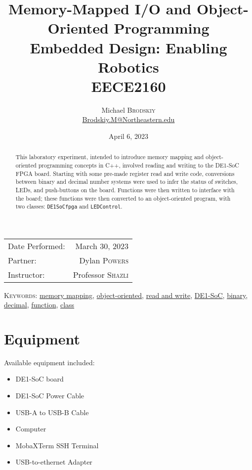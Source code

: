 \documentclass[
	letterpaper, %
	10pt, %
]{CSUniSchoolLabReport}
\title{Memory-Mapped I/O and Object-Oriented Programming\\ Embedded Design: Enabling Robotics \\ EECE2160} %
\author{Michael \textsc{Brodskiy}\\ \small \href{mailto:Brodskiy.M@Northeastern.edu}{Brodskiy.M@Northeastern.edu}}
\date{April 6, 2023} %
\begin{document}
\maketitle %

\begin{center}
	\begin{tabular}{l r}
		Date Performed: & March 30, 2023 \\ %
        Partner: & Dylan \textsc{Powers} \\ %
		Instructor: & Professor \textsc{Shazli} %
	\end{tabular}
\end{center}

\newpage

\begin{abstract}

  This laboratory experiment, intended to introduce memory mapping and object-oriented programming concepts in C++, involved reading and writing to the DE1-SoC FPGA board. Starting with some pre-made register read and write code, conversions between binary and decimal number systems were used to infer the status of switches, LEDs, and push-buttons on the board. Functions were then written to interface with the board; these functions were then converted to an object-oriented program, with two classes: \texttt{DE1SoCfpga} and \texttt{LEDControl}.

\end{abstract}

\begin{flushleft}

  \textsc{Keywords:} \underline{memory mapping}, \underline{object-oriented}, \underline{read and write}, \underline{DE1-SoC}, \underline{binary}, \underline{decimal}, \underline{function}, \underline{class}

\end{flushleft}

\newpage

\section{Equipment}

\hspace{.5 in} Available equipment included:\\

\begin{itemize}

  \item DE1-SoC board

  \item DE1-SoC Power Cable

  \item USB-A to USB-B Cable

  \item Computer

  \item MobaXTerm SSH Terminal

  \item USB-to-ethernet Adapter

\end{itemize}
\end{document}
